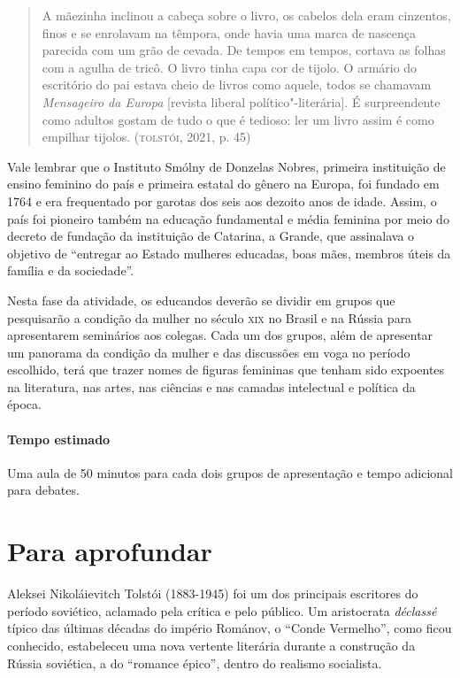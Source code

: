 \documentclass[11pt]{extarticle}
\begin{document}
\begin{quote}
A mãezinha inclinou a cabeça sobre o livro, os cabelos dela eram
cinzentos, finos e se enrolavam na têmpora, onde havia uma marca de
nascença parecida com um grão de cevada. De tempos em tempos, cortava as
folhas com a agulha de tricô. O livro tinha capa cor de tijolo. O
armário do escritório do pai estava cheio de livros como aquele, todos
se chamavam \emph{Mensageiro da Europa} {[}revista liberal
político"-literária{]}. É surpreendente como adultos gostam de tudo o que
é tedioso: ler um livro assim é como empilhar tijolos. (\textsc{tolstói}, 2021,
p. 45)
\end{quote}

Vale lembrar que o Instituto Smólny de Donzelas Nobres, primeira
instituição de ensino feminino do país e primeira estatal do gênero na
Europa, foi fundado em 1764 e era frequentado por garotas dos seis aos
dezoito anos de idade. Assim, o país foi pioneiro também na educação
fundamental e média feminina por meio do decreto de fundação da
instituição de Catarina, a Grande, que assinalava o objetivo de
``entregar ao Estado mulheres educadas, boas mães, membros úteis da
família e da sociedade''.


Nesta fase da atividade, os educandos deverão se dividir em grupos que
pesquisarão a condição da mulher no século \textsc{xix} no Brasil e na Rússia
para apresentarem seminários aos colegas. Cada um dos grupos, além de
apresentar um panorama da condição da mulher e das discussões em voga no
período escolhido, terá que trazer nomes de figuras femininas que tenham
sido expoentes na literatura, nas artes, nas ciências e nas camadas
intelectual e política da época.

\paragraph{Tempo estimado} Uma aula de 50 minutos para cada dois grupos de
apresentação e tempo adicional para debates.

\section{Para aprofundar}

Aleksei Nikoláievitch Tolstói
(1883-1945) foi um dos principais escritores do período soviético,
aclamado pela crítica e pelo público. Um aristocrata \emph{déclassé}
típico das últimas décadas do império Románov, o ``Conde Vermelho'',
como ficou conhecido, estabeleceu uma nova vertente literária durante a
construção da Rússia soviética, a do ``romance épico'', dentro do
realismo socialista.
\end{document}
